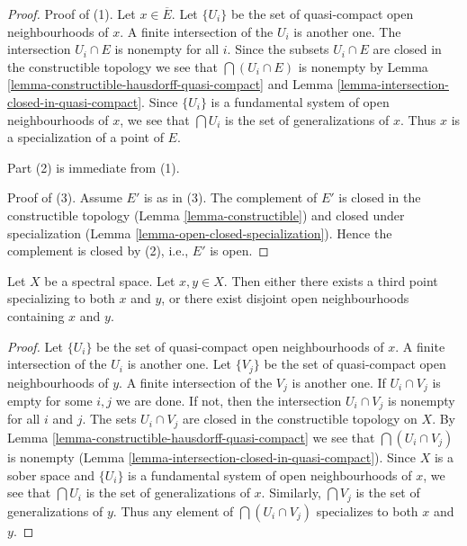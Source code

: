\begin{proof}
Proof of (1). Let $x \in \overline{E}$. Let $\{U_i\}$ be the set of
quasi-compact open neighbourhoods of $x$. A finite intersection of the
$U_i$ is another one. The intersection $U_i \cap E$ is nonempty for all
$i$. Since the subsets $U_i \cap E$ are closed in the constructible topology
we see that $\bigcap (U_i \cap E)$ is nonempty by
Lemma \ref{lemma-constructible-hausdorff-quasi-compact} and
Lemma \ref{lemma-intersection-closed-in-quasi-compact}.
Since $\{U_i\}$ is a
fundamental system of open neighbourhoods of $x$, we see that
$\bigcap U_i$ is the set of generalizations of $x$. Thus
$x$ is a specialization of a point of $E$.

\medskip\noindent
Part (2) is immediate from (1).

\medskip\noindent
Proof of (3). Assume $E'$ is as in (3). The complement of $E'$ is closed
in the constructible topology (Lemma \ref{lemma-constructible})
and closed under specialization
(Lemma \ref{lemma-open-closed-specialization}).
Hence the complement is closed by (2), i.e., $E'$ is open.
\end{proof}

\begin{lemma}
\label{lemma-two-points}
Let $X$ be a spectral space. Let $x, y \in X$. Then either there exists
a third point specializing to both $x$ and $y$, or there exist disjoint
open neighbourhoods containing $x$ and $y$.
\end{lemma}

\begin{proof}
Let $\{U_i\}$ be the set of quasi-compact open neighbourhoods of $x$.
A finite intersection of the $U_i$ is another one.
Let $\{V_j\}$ be the set of quasi-compact open neighbourhoods of $y$.
A finite intersection of the $V_j$ is another one.
If $U_i \cap V_j$ is empty for some $i, j$ we are done.
If not, then the intersection $U_i \cap V_j$ is nonempty
for all $i$ and $j$. The sets $U_i \cap V_j$ are closed in the constructible
topology on $X$. By
Lemma \ref{lemma-constructible-hausdorff-quasi-compact}
we see that $\bigcap (U_i \cap V_j)$ is nonempty
(Lemma \ref{lemma-intersection-closed-in-quasi-compact}).
Since $X$ is a sober space and $\{U_i\}$ is a
fundamental system of open neighbourhoods of $x$, we see that
$\bigcap U_i$ is the set of generalizations of $x$.
Similarly, $\bigcap V_j$ is the set of generalizations of $y$.
Thus any element of $\bigcap (U_i \cap V_j)$ specializes to both
$x$ and $y$.
\end{proof}


